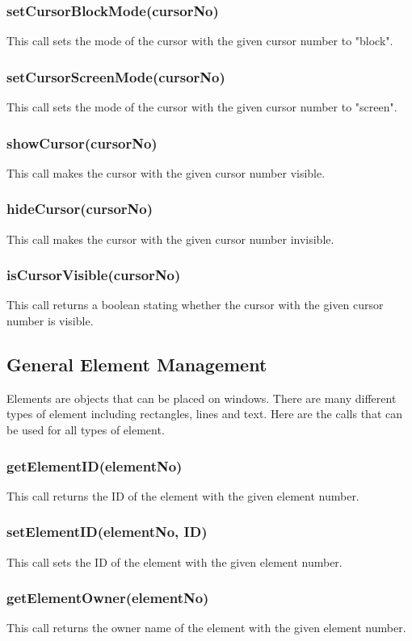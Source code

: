 \documentclass{acm_proc_article-sp}
\begin{document}
\subsubsection{setCursorBlockMode(cursorNo)}
This call sets the mode of the cursor with the given cursor number to "block".
\subsubsection{setCursorScreenMode(cursorNo)}
This call sets the mode of the cursor with the given cursor number to "screen".
\subsubsection{showCursor(cursorNo)}
This call makes the cursor with the given cursor number visible.
\subsubsection{hideCursor(cursorNo)}
This call makes the cursor with the given cursor number invisible.
\subsubsection{isCursorVisible(cursorNo)}
This call returns a boolean stating whether the cursor with the given cursor number is visible.
\subsection{General Element Management}
Elements are objects that can be placed on windows. There are many different types of element including rectangles, lines and text. Here are the calls that can be used for all types of element.
\subsubsection{getElementID(elementNo)}
This call returns the ID of the element with the given element number.
\subsubsection{setElementID(elementNo, ID)}
This call sets the ID of the element with the given element number.
\subsubsection{getElementOwner(elementNo)}
This call returns the owner name of the element with the given element number.
\end{document}
